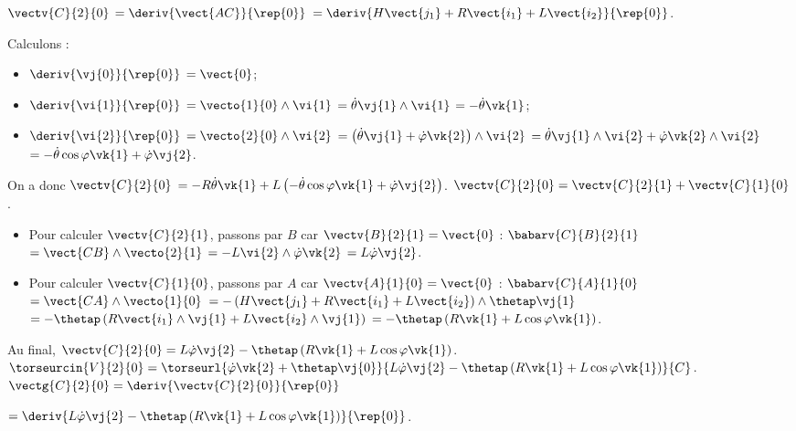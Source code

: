 \begin{corrigebox}
$\vectv{C}{2}{0}$ 
$=\deriv{\vect{AC}}{\rep{0}}$
$=\deriv{H\vect{j_1}+R\vect{i_1}+L\vect{i_2}}{\rep{0}}$.

Calculons : 
\begin{itemize}
\item $\deriv{\vj{0}}{\rep{0}}$ $=\vect{0}$;
\item $\deriv{\vi{1}}{\rep{0}}$ $=\vecto{1}{0} \wedge \vi{1}$ $=\dot{\theta}\vj{1} \wedge \vi{1}$ $=-\dot{\theta}\vk{1}$;
\item $\deriv{\vi{2}}{\rep{0}}$ $=\vecto{2}{0} \wedge \vi{2}$ 
$=\left(\dot{\theta}\vj{1} + \dot{\varphi}\vk{2}\right)\wedge \vi{2}$
$=\dot{\theta}\vj{1}\wedge \vi{2} + \dot{\varphi}\vk{2}\wedge \vi{2}$
$=-\dot{\theta}\cos\varphi\vk{1} + \dot{\varphi}\vj{2}$.
\end{itemize}

On a donc 
$\vectv{C}{2}{0}$ 
$= -R\dot{\theta}\vk{1}+L\left(-\dot{\theta}\cos\varphi\vk{1} + \dot{\varphi}\vj{2}\right)$.
$\vectv{C}{2}{0}=\vectv{C}{2}{1}+\vectv{C}{1}{0}$.

\begin{itemize}
\item Pour calculer $\vectv{C}{2}{1}$, passons par $B$ car $\vectv{B}{2}{1}=\vect{0}$ :
$\babarv{C}{B}{2}{1}$
$ = \vect{CB}\wedge\vecto{2}{1}$
$ = -L\vi{2}\wedge\dot{\varphi}\vk{2}$
$ = L\dot{\varphi}\vj{2}$.
\item Pour calculer $\vectv{C}{1}{0}$, passons par $A$ car $\vectv{A}{1}{0}=\vect{0}$ :
$\babarv{C}{A}{1}{0}$
$ = \vect{CA}\wedge\vecto{1}{0}$
$ = -\left( H\vect{j_1}+R\vect{i_1}+L\vect{i_2}\right)\wedge\thetap\vj{1}$
$ = -\thetap\left( R\vect{i_1}\wedge\vj{1}+L\vect{i_2}\wedge\vj{1}\right)$
$ = -\thetap\left( R\vk{1}+L\cos\varphi\vk{1}\right)$.
\end{itemize}

Au final, $\vectv{C}{2}{0}= L\dot{\varphi}\vj{2}-\thetap\left( R\vk{1}+L\cos\varphi\vk{1}\right)$.
$\torseurcin{V}{2}{0}=\torseurl{\dot{\varphi}\vk{2}+\thetap\vj{0}}{ L\dot{\varphi}\vj{2}-\thetap\left( R\vk{1}+L\cos\varphi\vk{1}\right)}{C}$.
$\vectg{C}{2}{0} =\deriv{\vectv{C}{2}{0}}{\rep{0}}$

$ =\deriv{ L\dot{\varphi}\vj{2}-\thetap\left( R\vk{1}+L\cos\varphi\vk{1}\right)}{\rep{0}} $.


\end{corrigebox}
